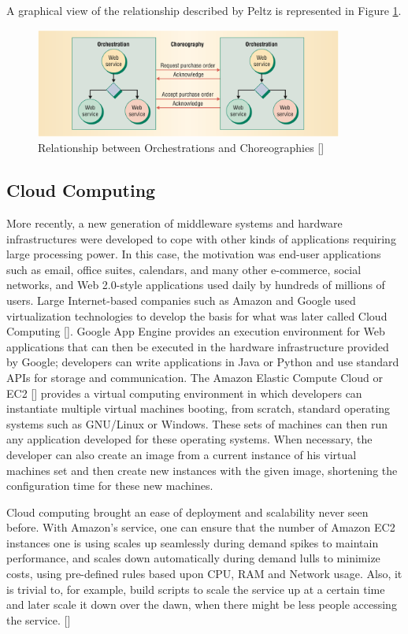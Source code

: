 A graphical view of the relationship described by Peltz is represented in Figure \ref{relation-orchestrationXchoreography}.

\begin{figure}[htb]
	\centering
	\includegraphics[width=0.9\textwidth]{images/relation-orchestrationXchoreography}
	\caption{Relationship between Orchestrations and Choreographies [\citet{WSOC}]}
	\label{relation-orchestrationXchoreography}
\end{figure}




\subsection{Cloud Computing}
More recently, a new generation of middleware systems and hardware infrastructures were developed to cope with other kinds of applications requiring large processing power. In this case, the motivation was end-user applications such as email, office suites, calendars, and many other e-commerce, social networks, and Web 2.0-style applications used daily by hundreds of millions of users. Large Internet-based companies such as Amazon and Google used virtualization technologies to develop the basis for what was later called Cloud Computing [\citet{ZCB10}]. Google App Engine provides an execution environment for Web applications that can then be executed in the hardware infrastructure provided by Google; developers can write applications in Java or Python and use standard APIs for storage and communication.  The Amazon Elastic Compute Cloud or EC2 [\citet{EC2}] provides a virtual computing environment in which developers can instantiate multiple virtual machines booting, from scratch, standard operating systems such as GNU/Linux or Windows. These sets of machines can then run any application developed for these operating systems. When necessary, the developer can also create an image from a current instance of his virtual machines set and then create new instances with the given image, shortening the configuration time for these new machines.

Cloud computing brought an ease of deployment and scalability never seen before. With Amazon's service, one can ensure that the number of Amazon EC2 instances one is using scales up seamlessly during demand spikes to maintain performance, and scales down automatically during demand lulls to minimize costs, using pre-defined rules based upon CPU, RAM and Network usage. Also, it is trivial to, for example, build scripts to scale the service up at a certain time and later scale it down over the dawn, when there might be less people accessing the service. [\citet{AUTO-SCALE}]

